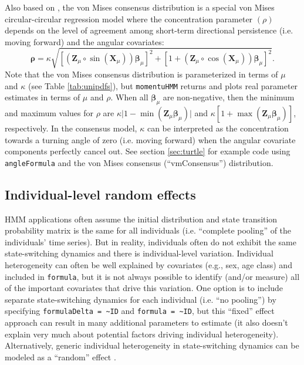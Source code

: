 \documentclass[12pt]{article}\usepackage[]{graphicx}\usepackage[]{xcolor}
\begin{document}
Also based on \cite{RivestEtAl2016}, the von Mises consensus distribution is a special von Mises circular-circular regression model where the concentration parameter $(\rho)$ depends on the level of agreement among short-term directional persistence (i.e. moving forward) and the angular covariates:
\begin{equation}
  {\boldsymbol \rho}=\kappa \sqrt{\left[({\mathbf Z}_\mu \circ \sin({\mathbf X}_\mu)){\boldsymbol \beta}_\mu\right]^2+\left[1+({\mathbf Z}_\mu \circ \cos({\mathbf X}_\mu)){\boldsymbol \beta}_\mu\right]^2}.
  \label{eq:consensus}
\end{equation}
Note that the von Mises consensus distribution is parameterized in terms of $\mu$ and $\kappa$ (see Table \ref{tab:unipdfs}), but \verb|momentuHMM| returns and plots real parameter estimates in terms of $\mu$ and $\rho$. When all ${\boldsymbol \beta}_\mu$ are non-negative, then the minimum and maximum values for $\rho$ are $\kappa \lvert 1-\min({\mathbf Z}_\mu {\boldsymbol \beta}_\mu) \rvert$ and $\kappa \left[1+\max({\mathbf Z}_\mu {\boldsymbol \beta}_\mu)\right]$, respectively.  In the consensus model, $\kappa$ can be interpreted as the concentration towards a turning angle of zero (i.e. moving forward) when the angular covariate components perfectly cancel out. %
See section \ref{sec:turtle} for example code using \verb|angleFormula| and the von Mises consensus (``vmConsensus'') distribution.

\subsection{Individual-level random effects}
\label{sec:randomEffects}
HMM applications often assume the initial distribution and state transition probability matrix is the same for all individuals (i.e. ``complete pooling'' of the individuals' time series). But in reality, individuals often do not exhibit the same state-switching dynamics and there is individual-level variation.  Individual heterogeneity can often be well explained by covariates (e.g., sex, age class) and included in \verb|formula|, but it is not always possible to identify (and/or measure) all of the important covariates that drive this variation. One option is to include separate state-switching dynamics for each individual (i.e. ``no pooling'') by specifying \verb|formulaDelta = ~ID| and \verb|formula = ~ID|, but this ``fixed'' effect approach can result in many additional parameters to estimate (it also doesn't explain very much about potential factors driving individual heterogeneity). Alternatively, generic individual heterogeneity in state-switching dynamics can be modeled as a ``random'' effect \citep[e.g.][]{McClintock2021}. 
\end{document}
